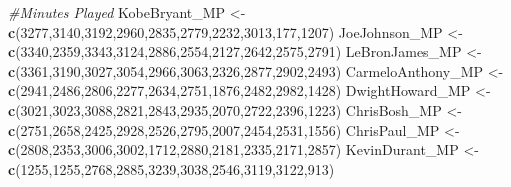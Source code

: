 \documentclass[
]{article}
\newenvironment{Shaded}{\begin{snugshade}}{\end{snugshade}}
\newcommand{\CommentTok}[1]{\textcolor[rgb]{0.56,0.35,0.01}{\textit{#1}}}
\newcommand{\DecValTok}[1]{\textcolor[rgb]{0.00,0.00,0.81}{#1}}
\newcommand{\KeywordTok}[1]{\textcolor[rgb]{0.13,0.29,0.53}{\textbf{#1}}}
\newcommand{\NormalTok}[1]{#1}
\newcommand{\StringTok}[1]{\textcolor[rgb]{0.31,0.60,0.02}{#1}}
\begin{document}
\begin{Shaded}
\begin{Highlighting}[]
\CommentTok{#Minutes Played}
\NormalTok{KobeBryant_MP <-}\StringTok{ }\KeywordTok{c}\NormalTok{(}\DecValTok{3277}\NormalTok{,}\DecValTok{3140}\NormalTok{,}\DecValTok{3192}\NormalTok{,}\DecValTok{2960}\NormalTok{,}\DecValTok{2835}\NormalTok{,}\DecValTok{2779}\NormalTok{,}\DecValTok{2232}\NormalTok{,}\DecValTok{3013}\NormalTok{,}\DecValTok{177}\NormalTok{,}\DecValTok{1207}\NormalTok{)}
\NormalTok{JoeJohnson_MP <-}\StringTok{ }\KeywordTok{c}\NormalTok{(}\DecValTok{3340}\NormalTok{,}\DecValTok{2359}\NormalTok{,}\DecValTok{3343}\NormalTok{,}\DecValTok{3124}\NormalTok{,}\DecValTok{2886}\NormalTok{,}\DecValTok{2554}\NormalTok{,}\DecValTok{2127}\NormalTok{,}\DecValTok{2642}\NormalTok{,}\DecValTok{2575}\NormalTok{,}\DecValTok{2791}\NormalTok{)}
\NormalTok{LeBronJames_MP <-}\StringTok{ }\KeywordTok{c}\NormalTok{(}\DecValTok{3361}\NormalTok{,}\DecValTok{3190}\NormalTok{,}\DecValTok{3027}\NormalTok{,}\DecValTok{3054}\NormalTok{,}\DecValTok{2966}\NormalTok{,}\DecValTok{3063}\NormalTok{,}\DecValTok{2326}\NormalTok{,}\DecValTok{2877}\NormalTok{,}\DecValTok{2902}\NormalTok{,}\DecValTok{2493}\NormalTok{)}
\NormalTok{CarmeloAnthony_MP <-}\StringTok{ }\KeywordTok{c}\NormalTok{(}\DecValTok{2941}\NormalTok{,}\DecValTok{2486}\NormalTok{,}\DecValTok{2806}\NormalTok{,}\DecValTok{2277}\NormalTok{,}\DecValTok{2634}\NormalTok{,}\DecValTok{2751}\NormalTok{,}\DecValTok{1876}\NormalTok{,}\DecValTok{2482}\NormalTok{,}\DecValTok{2982}\NormalTok{,}\DecValTok{1428}\NormalTok{)}
\NormalTok{DwightHoward_MP <-}\StringTok{ }\KeywordTok{c}\NormalTok{(}\DecValTok{3021}\NormalTok{,}\DecValTok{3023}\NormalTok{,}\DecValTok{3088}\NormalTok{,}\DecValTok{2821}\NormalTok{,}\DecValTok{2843}\NormalTok{,}\DecValTok{2935}\NormalTok{,}\DecValTok{2070}\NormalTok{,}\DecValTok{2722}\NormalTok{,}\DecValTok{2396}\NormalTok{,}\DecValTok{1223}\NormalTok{)}
\NormalTok{ChrisBosh_MP <-}\StringTok{ }\KeywordTok{c}\NormalTok{(}\DecValTok{2751}\NormalTok{,}\DecValTok{2658}\NormalTok{,}\DecValTok{2425}\NormalTok{,}\DecValTok{2928}\NormalTok{,}\DecValTok{2526}\NormalTok{,}\DecValTok{2795}\NormalTok{,}\DecValTok{2007}\NormalTok{,}\DecValTok{2454}\NormalTok{,}\DecValTok{2531}\NormalTok{,}\DecValTok{1556}\NormalTok{)}
\NormalTok{ChrisPaul_MP <-}\StringTok{ }\KeywordTok{c}\NormalTok{(}\DecValTok{2808}\NormalTok{,}\DecValTok{2353}\NormalTok{,}\DecValTok{3006}\NormalTok{,}\DecValTok{3002}\NormalTok{,}\DecValTok{1712}\NormalTok{,}\DecValTok{2880}\NormalTok{,}\DecValTok{2181}\NormalTok{,}\DecValTok{2335}\NormalTok{,}\DecValTok{2171}\NormalTok{,}\DecValTok{2857}\NormalTok{)}
\NormalTok{KevinDurant_MP <-}\StringTok{ }\KeywordTok{c}\NormalTok{(}\DecValTok{1255}\NormalTok{,}\DecValTok{1255}\NormalTok{,}\DecValTok{2768}\NormalTok{,}\DecValTok{2885}\NormalTok{,}\DecValTok{3239}\NormalTok{,}\DecValTok{3038}\NormalTok{,}\DecValTok{2546}\NormalTok{,}\DecValTok{3119}\NormalTok{,}\DecValTok{3122}\NormalTok{,}\DecValTok{913}\NormalTok{)}

\end{Highlighting}
\end{Shaded}
\end{document}
